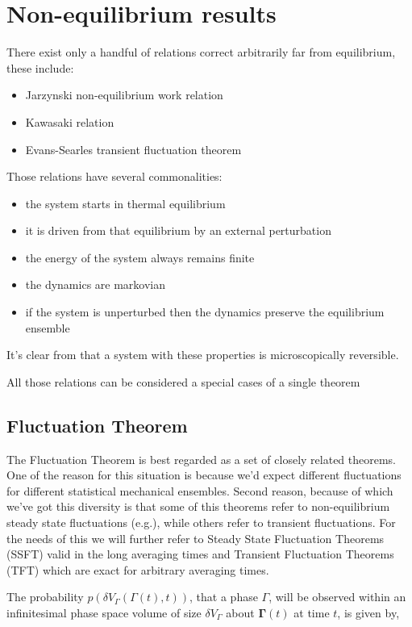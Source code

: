 \documentclass[a4paper,12pt,nofootinbib]{article}
\begin{document}
\section{Non-equilibrium results}
There exist only a handful of relations correct arbitrarily far from equilibrium, these include:
\begin{itemize}
  \item Jarzynski non-equilibrium work relation
  \item Kawasaki relation
  \item Evans-Searles transient fluctuation theorem
\end{itemize}
Those relations have several commonalities:
\begin{itemize}
  \item the system starts in thermal equilibrium
  \item it is driven from that equilibrium by an external perturbation
  \item the energy of the system always remains finite
  \item the dynamics are markovian 
  \item if the system is unperturbed then the dynamics preserve the equilibrium ensemble
\end{itemize}
It's clear from that a system with these properties is microscopically reversible.

All those relations can be considered a special cases of a single theorem



\subsection{Fluctuation Theorem}
The Fluctuation Theorem is best regarded as a set of closely related theorems.
One of the reason for this situation is because we'd expect different fluctuations for different statistical mechanical ensembles.
Second reason, because of which we've got this diversity is that some of this theorems refer to non-equilibrium steady state fluctuations (e.g.), while others refer to transient fluctuations.
For the needs of this we will further refer to Steady State Fluctuation Theorems (SSFT) valid in the long averaging times and Transient Fluctuation Theorems (TFT) which are exact for arbitrary averaging times.

The probability $p(\delta V_{\Gamma}(\Gamma(t),t))$, that a phase $\Gamma$, will be observed within an infinitesimal phase space volume of size $\delta V_{\Gamma}$ about $\bm{\Gamma}(t)$ at time $t$, is given by,
\end{document}
